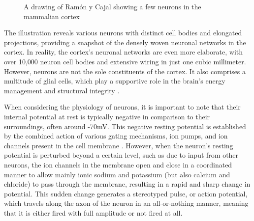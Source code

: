 \documentclass[12pt,a4paper]{report}
\begin{document}
\begin{figure}[H]
\centering %
\caption{A drawing of Ramón y Cajal showing a few neurons in the mammalian cortex \cite{ref2}} 
\end{figure}

The illustration reveals various neurons with distinct cell bodies and elongated projections, providing a snapshot of the densely woven neuronal networks in the cortex. In reality, the cortex’s neuronal networks are even more elaborate, with over 10,000 neuron cell bodies and extensive wiring in just one cubic millimeter. However, neurons are not the sole constituents of the cortex. It also comprises a multitude of glial cells, which play a supportive role in the brain’s energy management and structural integrity \cite{ref2}. 

When considering the physiology of neurons, it is important to note that their internal potential at rest is typically negative in comparison to their surroundings, often around -70mV. This negative resting potential is established by the combined action of various gating mechanisms, ion pumps, and ion channels present in the cell membrane \cite{ref3}. However, when the neuron's resting potential is perturbed beyond a certain level, such as due to input from other neurons, the ion channels in the membrane open and close in a coordinated manner to allow mainly ionic sodium and potassium (but also calcium and chloride) to pass through the membrane, resulting in a rapid and sharp change in potential. This sudden change generates a stereotyped pulse, or action potential, which travels along the axon of the neuron in an all-or-nothing manner, meaning that it is either fired with full amplitude or not fired at all.
\end{document}
